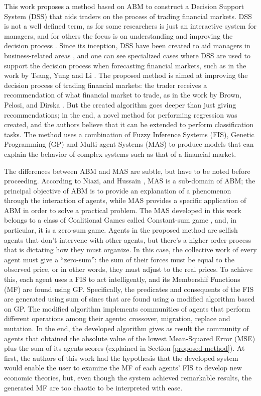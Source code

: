 \documentclass[12pt,journal,draftcls,onecolumn]{IEEEtran}
\begin{document}
This work proposes a method based on ABM to construct a Decision Support System (DSS) that aids traders on the process of trading financial markets. DSS is not a well defined term, as for some researchers is just an interactive system for managers, and for others the focus is on understanding and improving the decision process \cite{keen1980decision}. Since its inception, DSS have been created to aid managers in business-related areas \cite{Sprague1980} \cite{little1979decision}, and one can see specialized cases where DSS are used to support the decision process when forecasting financial markets, such as in the work by Tsang, Yung and Li \cite{Tsang2004}. The proposed method is aimed at improving the decision process of trading financial markets: the trader receives a recommendation of what financial market to trade, as in the work by Brown, Pelosi, and Dirska \cite{brown2013dynamic}. But the created algorithm goes deeper than just giving recommendations; in the end, a novel method for performing regression was created, and the authors believe that it can be extended to perform classification tasks. The method uses a combination of Fuzzy Inference Systems (FIS), Genetic Programming (GP) \cite{poli2008field} \cite{Koza1992} and Multi-agent Systems (MAS) \cite{Shoham2009} to produce models that can explain the behavior of complex systems such as that of a financial market.

The differences between ABM and MAS are subtle, but have to be noted before proceeding. According to Niazi, and Hussain \cite{Niazi_2011}, MAS is a sub-domain of ABM; the principal objective of ABM is to provide an explanation of a phenomenon through the interaction of agents, while MAS provides a specific application of ABM in order to solve a practical problem. The MAS developed in this work belongs to a class of Coalitional Games called Constant-sum game \cite{Shoham2009}, and, in particular, it is a zero-sum game. Agents in the proposed method are selfish agents that don't intervene with other agents, but there's a higher order process that is dictating how they must organize. In this case, the collective work of every agent must give a ``zero-sum'': the sum of their forces must be equal to the observed price, or in other words, they must adjust to the real prices. To achieve this, each agent uses a FIS to act intelligently, and its Membershif Functions (MF) are found using GP. Specifically, the predicates and consequents of the FIS are generated using sum of sines that are found using a modified algorithm based on GP. The modified algorithm implements communities of agents that perform different operations among their agents: crossover, migration, replace and mutation. In the end, the developed algorithm gives as result the community of agents that obtained the absolute value of the lowest Mean-Squared Error (MSE) plus the sum of its agents scores (explained in Section \ref{proposed-method}). At first, the authors of this work had the hypothesis that the developed system would enable the user to examine the MF of each agents' FIS to develop new economic theories, but, even though the system achieved remarkable results, the generated MF are too chaotic to be interpreted with ease.
\end{document}
